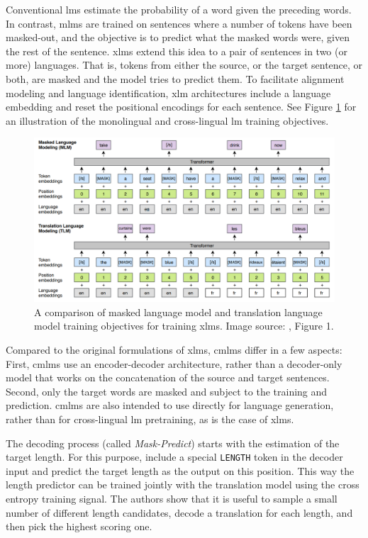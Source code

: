 Conventional \acp{lm} estimate the probability of a word given the preceding
words.  In contrast, \acp{mlm} are trained on sentences where a number of
tokens have been masked-out, and the objective is to predict what the masked
words were, given the rest of the sentence. \Acp{xlm} extend this idea to a
pair of sentences in two (or more) languages. That is, tokens from either the
source, or the target sentence, or both, are masked and the model tries to
predict them.  To facilitate alignment modeling and language identification,
\ac{xlm} architectures include a language embedding and reset the positional
encodings for each sentence. See Figure \ref{fig:mlm-xlm-example} for an
illustration of the monolingual and cross-lingual \ac{lm} training objectives.

\begin{figure}
  \centering

  \includegraphics[width=\textwidth]{img/mlm-xlm.png}

  \caption{A comparison of masked language model and translation language model
    training objectives for training \aclp{xlm}. Image source:
    \citet{conneau-lample-2019-cross}, Figure 1.}%
  \label{fig:mlm-xlm-example}
\end{figure}

Compared to the original formulations of \acp{xlm}, \acp{cmlm} differ in a few
aspects: First, \acp{cmlm} use an encoder-decoder architecture, rather than a
decoder-only model that works on the concatenation of the source and target
sentences. Second, only the target words are masked and subject to the training
and prediction. \Acp{cmlm} are also intended to use directly for language
generation, rather than for cross-lingual \ac{lm} pretraining, as is the case
of \acp{xlm}.

The decoding process (called \emph{Mask-Predict}) starts with the estimation of
the target length. For this purpose, \citet{ghazvininejad-etal-2019-mask}
include a special \texttt{LENGTH} token in the decoder input and predict the
target length as the output on this position. This way the length predictor can
be trained jointly with the translation model using the cross entropy training
signal. The authors show that it is useful to sample a small number of
different length candidates, decode a translation for each length, and then
pick the highest scoring one.


